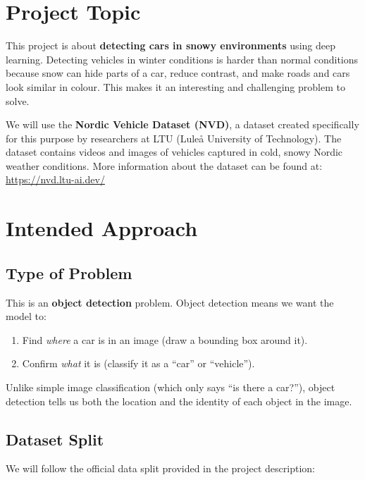 \section{Project Topic}
 
This project is about \textbf{detecting cars in snowy environments} using deep learning.
Detecting vehicles in winter conditions is harder than normal conditions because snow
can hide parts of a car, reduce contrast, and make roads and cars look similar in colour.
This makes it an interesting and challenging problem to solve.
 
We will use the \textbf{Nordic Vehicle Dataset (NVD)}, a dataset created specifically for
this purpose by researchers at LTU (Luleå University of Technology). The dataset contains
videos and images of vehicles captured in cold, snowy Nordic weather conditions.
More information about the dataset can be found at:
\url{https://nvd.ltu-ai.dev/}
 
\section{Intended Approach}
 
\subsection{Type of Problem}
 
This is an \textbf{object detection} problem. Object detection means we want the model to:
\begin{enumerate}
    \item Find \textit{where} a car is in an image (draw a bounding box around it).
    \item Confirm \textit{what} it is (classify it as a ``car'' or ``vehicle'').
\end{enumerate}
Unlike simple image classification (which only says ``is there a car?''), object detection
tells us both the location and the identity of each object in the image.
 
\subsection{Dataset Split}
 
We will follow the official data split provided in the project description:
 
